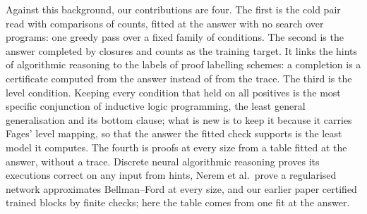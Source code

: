 Against this background, our contributions are four. The first is the cold pair read with comparisons of counts,
fitted at the answer with no search over programs: one greedy pass over a fixed family of conditions. The second is
the answer completed by closures and counts as the training target. It links the hints of algorithmic reasoning to the
labels of proof labelling schemes: a completion is a certificate computed from the answer instead of from the trace.
The third is the level condition. Keeping every condition that held on all positives is the most specific conjunction
of inductive logic programming, the least general generalisation and its bottom clause\cite{plotkin1970note,muggleton1995inverse};
what is new is to keep it because it carries Fages' level mapping, so that the answer the fitted check supports is the
least model it computes. The fourth is proofs at every size from a table fitted at the answer, without a trace. Discrete
neural algorithmic reasoning proves its executions correct on any input from hints\cite{rodionov2025discrete}, Nerem
et al.\ prove a regularised network approximates Bellman--Ford at every size\cite{nerem2025graph}, and our earlier paper
certified trained blocks by finite checks\cite{mohsenvand2026zero}; here the table comes from one fit at the answer.
